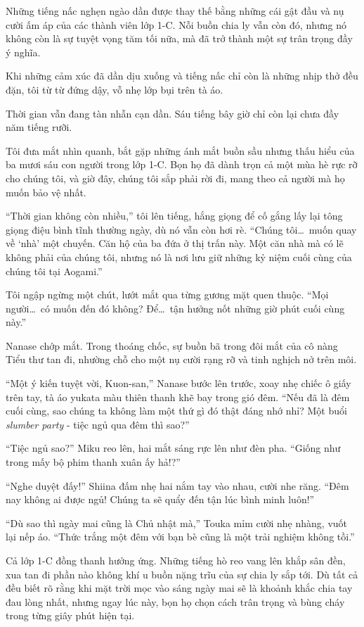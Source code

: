\documentclass[../main.tex]{subfiles}
\begin{document}
Những tiếng nấc nghẹn ngào dần được thay thế bằng những cái gật đầu và nụ cười ấm áp của các thành viên lớp 1-C. Nỗi buồn chia ly vẫn còn đó, nhưng nó không còn là sự tuyệt vọng tăm tối nữa, mà đã trở thành một sự trân trọng đầy ý nghĩa.

\ct

Khi những cảm xúc đã dần dịu xuống và tiếng nấc chỉ còn là những nhịp thở đều đặn, tôi từ từ đứng dậy, vỗ nhẹ lớp bụi trên tà áo.

Thời gian vẫn đang tàn nhẫn cạn dần. Sáu tiếng bây giờ chỉ còn lại chưa đầy năm tiếng rưỡi.

Tôi đưa mắt nhìn quanh, bắt gặp những ánh mắt buồn sầu nhưng thấu hiểu của ba mươi sáu con người trong lớp 1-C. Bọn họ đã dành trọn cả một mùa hè rực rỡ cho chúng tôi, và giờ đây, chúng tôi sắp phải rời đi, mang theo cả người mà họ muốn bảo vệ nhất.

``Thời gian không còn nhiều,'' tôi lên tiếng, hắng giọng để cố gắng lấy lại tông giọng điệu bình tĩnh thường ngày, dù nó vẫn còn hơi rè. ``Chúng tôi\dots\ muốn quay về `nhà' một chuyến. Căn hộ của ba đứa ở thị trấn này. Một căn nhà mà có lẽ không phải của chúng tôi, nhưng nó là nơi lưu giữ những kỷ niệm cuối cùng của chúng tôi tại Aogami.''

Tôi ngập ngừng một chút, lướt mắt qua từng gương mặt quen thuộc. ``Mọi người\dots\ có muốn đến đó không? Để\dots\ tận hưởng nốt những giờ phút cuối cùng này.''

Nanase chớp mắt. Trong thoáng chốc, sự buồn bã trong đôi mắt của cô nàng Tiểu thư tan đi, nhường chỗ cho một nụ cười rạng rỡ và tinh nghịch nở trên môi.

``Một ý kiến tuyệt vời, Kuon-san,'' Nanase bước lên trước, xoay nhẹ chiếc ô giấy trên tay, tà áo yukata màu thiên thanh khẽ bay trong gió đêm. ``Nếu đã là đêm cuối cùng, sao chúng ta không làm một thứ gì đó thật đáng nhớ nhỉ? Một buổi \textit{slumber party} - tiệc ngủ qua đêm thì sao?''

``Tiệc ngủ sao?'' Miku reo lên, hai mắt sáng rực lên như đèn pha. ``Giống như trong mấy bộ phim thanh xuân ấy hả!?''

``Nghe duyệt đấy!'' Shiina đấm nhẹ hai nắm tay vào nhau, cười nhe răng. ``Đêm nay không ai được ngủ! Chúng ta sẽ quẩy đến tận lúc bình minh luôn!''

``Dù sao thì ngày mai cũng là Chủ nhật mà,'' Touka mỉm cười nhẹ nhàng, vuốt lại nếp áo. ``Thức trắng một đêm với bạn bè cũng là một trải nghiệm không tồi.''

Cả lớp 1-C đồng thanh hưởng ứng. Những tiếng hò reo vang lên khắp sân đền, xua tan đi phần nào không khí u buồn nặng trĩu của sự chia ly sắp tới. Dù tất cả đều biết rõ rằng khi mặt trời mọc vào sáng ngày mai sẽ là khoảnh khắc chia tay đau lòng nhất, nhưng ngay lúc này, bọn họ chọn cách trân trọng và bùng cháy trong từng giây phút hiện tại.
\end{document}
